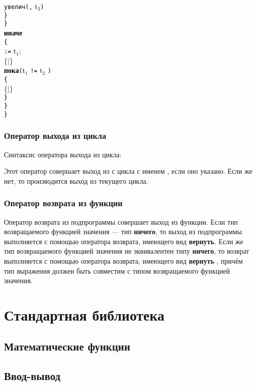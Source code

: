 \documentclass[10pt]{report}
\begin{document}
{{\phantom{конецмоимс}\textcolor{Black}{\texttt{увелич}}\textcolor{Black}{\texttt{(}}\textcolor{Black}{\texttt{,}} \textcolor{Black}{t$_3$}\textcolor{Black}{\texttt{)}}\\
\phantom{конец}\textcolor{Black}{\texttt{\}}}\\
\textcolor{Black}{\texttt{\}}}\\
\textcolor{Black}{\textbf{иначе}}\\
\textcolor{Black}{\texttt{\{}}\\
\phantom{конец} \textcolor{Black}{\texttt{:=}} \textcolor{Black}{t$_1$}\textcolor{Black}{;}\\
\phantom{конец}\{|\}\\
\phantom{конец}\textcolor{Black}{\textbf{пока}}\textcolor{Black}{\texttt{(}}\textcolor{Black}{t$_1$} \textcolor{Black}{\texttt{!=}} \textcolor{Black}{t$_2$}%
\textcolor{Black}{\texttt{)}}\\
\phantom{конец}\textcolor{Black}{\texttt{\{}}\\
\phantom{конецмоимс}\{|\}\\
\phantom{конец}\textcolor{Black}{\texttt{\}}}\\
\textcolor{Black}{\texttt{\}}}\\
\textcolor{Black}{\texttt{\}}}
}}

    \subsection{Оператор выхода из цикла}

Синтаксис оператора выхода из цикла:
\begin{center}
\textcolor{Green}{}
\end{center}
Этот оператор совершает выход из с цикла с именем \textcolor{Green}{}, если оно указано. Если же нет, то производится выход из текущего цикла.

    \subsection{Оператор возврата из функции}
Оператор возврата из подпрограммы совершает выход из функции. Если тип возвращаемого функцией значения --- тип \textbf{ничего}, то выход из подпрограммы выполняется
с помощью оператора возврата, имеющего вид \textbf{вернуть}. Если же тип возвращаемого функцией значения не эквивалентен типу \textbf{ничего}, то возврат выполняется
с помощью оператора возврата, имеющего вид \textbf{вернуть} \textcolor{Green}{}, причём тип выражения должен быть совместим с типом
возвращаемого функцией значения.




         
\chapter{Стандартная библиотека}
    \section{Математические функции}
    \section{Ввод-вывод}
\end{document}
